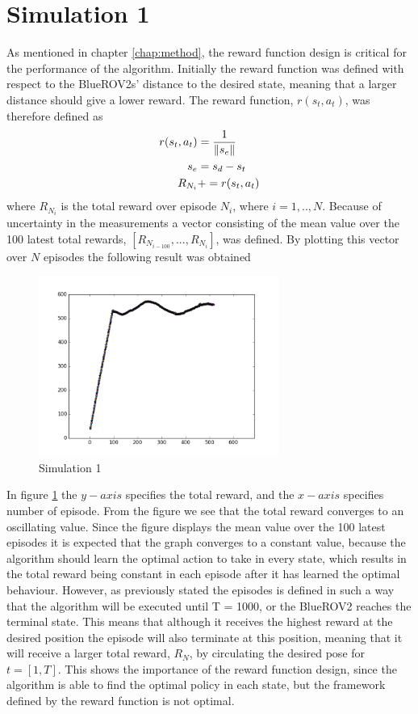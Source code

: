 \section{Simulation 1}
As mentioned in chapter \ref{chap:method}, the reward function design is critical for the performance of the algorithm. Initially the reward function was defined with respect to the BlueROV2s' distance to the desired state, meaning that a larger distance should give a lower reward. The reward function, $r(s_{t}, a_{t})$, was therefore defined as
\begin{align}
    r(s_{t}, a_{t}) & = \frac{1}{\left\lVert s_{e}\right\rVert} \\
    s_{e} & = s_{d} - s_{t} \\
    R_{N_{i}} & += r(s_{t}, a_{t})
\end{align}
where $R_{N_{i}}$ is the total reward over episode $N_{i}$, where $i=1,..,N$. Because of uncertainty in the measurements a vector consisting of the mean value over the 100 latest total rewards, $[R_{N_{i-100}},...,R_{N_{i}}]$, was defined. By plotting this vector over $N$ episodes the following result was obtained
\begin{figure}[H]
    \centering
    \includegraphics[width=0.7\textwidth]{images/chap5/figure_1.png}
    \caption{Simulation 1}
    \label{fig:sim1}
\end{figure}
In figure \ref{fig:sim1} the $y-axis$ specifies the total reward, and the $x-axis$ specifies number of episode. From the figure we see that the total reward converges to an oscillating value. Since the figure displays the mean value over the 100 latest episodes it is expected that the graph converges to a constant value, because the algorithm should learn the optimal action to take in every state, which results in the total reward being constant in each episode after it has learned the optimal behaviour. However, as previously stated the episodes is defined in such a way that the algorithm will be executed until T = 1000, or the BlueROV2 reaches the terminal state. This means that although it receives the highest reward at the desired position the episode will also terminate at this position, meaning that it will receive a larger total reward, $R_{N}$, by circulating the desired pose for $t=[1,T]$. This shows the importance of the reward function design, since the algorithm is able to find the optimal policy in each state, but the framework defined by the reward function is not optimal. 
